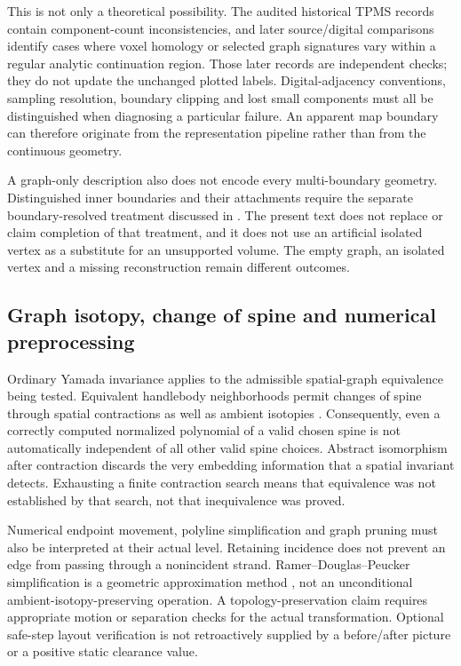 This is not only a theoretical possibility. The audited historical TPMS records contain component-count inconsistencies, and later source/digital comparisons identify cases where voxel homology or selected graph signatures vary within a regular analytic continuation region. Those later records are independent checks; they do not update the unchanged plotted labels. Digital-adjacency conventions, sampling resolution, boundary clipping and lost small components must all be distinguished when diagnosing a particular failure. An apparent map boundary can therefore originate from the representation pipeline rather than from the continuous geometry.

A graph-only description also does not encode every multi-boundary geometry. Distinguished inner boundaries and their attachments require the separate boundary-resolved treatment discussed in . The present text does not replace or claim completion of that treatment, and it does not use an artificial isolated vertex as a substitute for an unsupported volume. The empty graph, an isolated vertex and a missing reconstruction remain different outcomes.

\subsection{Graph isotopy, change of spine and numerical preprocessing}
\label{supp:limitations_equivalence}
Ordinary Yamada invariance applies to the admissible spatial-graph equivalence being tested. Equivalent handlebody neighborhoods permit changes of spine through spatial contractions as well as ambient isotopies \cite{kg_ishii2012handlebody}. Consequently, even a correctly computed normalized polynomial of a valid chosen spine is not automatically independent of all other valid spine choices. Abstract isomorphism after contraction discards the very embedding information that a spatial invariant detects. Exhausting a finite contraction search means that equivalence was not established by that search, not that inequivalence was proved.

Numerical endpoint movement, polyline simplification and graph pruning must also be interpreted at their actual level. Retaining incidence does not prevent an edge from passing through a nonincident strand. Ramer--Douglas--Peucker simplification is a geometric approximation method \cite{kg_ramer1972,kg_douglas1973}, not an unconditional ambient-isotopy-preserving operation. A topology-preservation claim requires appropriate motion or separation checks for the actual transformation. Optional safe-step layout verification is not retroactively supplied by a before/after picture or a positive static clearance value.

